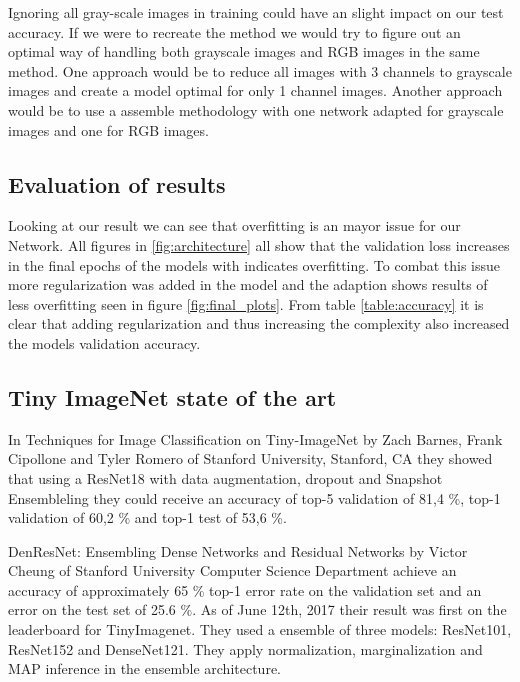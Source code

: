 \documentclass{kthreport}
\begin{document}
Ignoring all gray-scale images in training could have an slight impact on our test accuracy. If we were to recreate the method we would try to figure out an optimal way of handling both grayscale images and RGB images in the same method. One approach would be to reduce all images with 3 channels to grayscale images and create a model optimal for only 1 channel images. Another approach would be to use a assemble methodology with one network adapted for grayscale images and one for RGB images.

\subsection{Evaluation of results}

Looking at our result we can see that overfitting is an mayor issue for our Network.
All figures in \ref{fig:architecture} all show that the validation loss increases in the final epochs of the models with indicates overfitting.
To combat this issue more regularization was added in the model and the adaption shows results of less overfitting seen in figure \ref{fig:final_plots}.
From table \ref{table:accuracy} it is clear that adding regularization and thus increasing the complexity also increased the models validation accuracy.


\subsection{Tiny ImageNet state of the art}

In Techniques for Image Classification on Tiny-ImageNet by Zach Barnes, Frank Cipollone and Tyler Romero of Stanford University, Stanford, CA they showed that using a ResNet18 with data augmentation, dropout and Snapshot Ensembleling they could receive an accuracy of top-5 validation of 81,4 \%, top-1 validation of 60,2 \% and top-1 test of 53,6 \%.

DenResNet: Ensembling Dense Networks and Residual Networks by Victor Cheung of Stanford University Computer Science Department achieve an accuracy of approximately 65 \% top-1 error rate on the validation set and an error on the test set of 25.6 \%. As of June 12th, 2017 their result was first on the leaderboard for TinyImagenet. They used a  ensemble of three models: ResNet101, ResNet152 and DenseNet121. They apply normalization, marginalization and MAP inference in the ensemble architecture.
\end{document}
